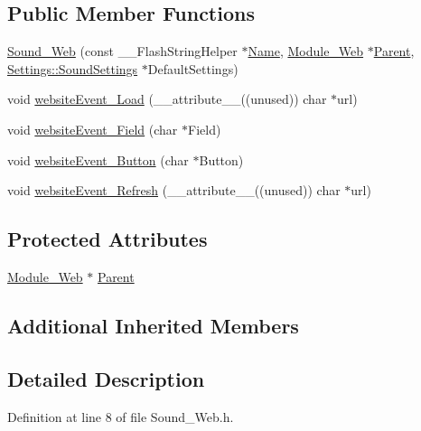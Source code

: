 \subsection*{Public Member Functions}
\begin{DoxyCompactItemize}
\item 
\hyperlink{class_sound___web_a986e9542148fc1fe9b803ea4edc17235}{Sound\+\_\+\+Web} (const \+\_\+\+\_\+\+Flash\+String\+Helper $\ast$\hyperlink{class_common_aeea91a726dbe988e515057b32ba0726f}{Name}, \hyperlink{class_module___web}{Module\+\_\+\+Web} $\ast$\hyperlink{class_sound___web_ac855dfbd5478cd3b7878d7fc1765ab9f}{Parent}, \hyperlink{struct_settings_1_1_sound_settings}{Settings\+::\+Sound\+Settings} $\ast$Default\+Settings)
\item 
void \hyperlink{class_sound___web_ae3a500bbde7e1264aeeb1bf43b5ba09f}{website\+Event\+\_\+\+Load} (\+\_\+\+\_\+attribute\+\_\+\+\_\+((unused)) char $\ast$url)
\item 
void \hyperlink{class_sound___web_a3f9b60318e13f510c7ed49cc52962424}{website\+Event\+\_\+\+Field} (char $\ast$Field)
\item 
void \hyperlink{class_sound___web_ab55e679fab59cd3fae2b7900d31a0893}{website\+Event\+\_\+\+Button} (char $\ast$Button)
\item 
void \hyperlink{class_sound___web_a4b2c5db998fe35455bd3e82ae021d81b}{website\+Event\+\_\+\+Refresh} (\+\_\+\+\_\+attribute\+\_\+\+\_\+((unused)) char $\ast$url)
\end{DoxyCompactItemize}
\subsection*{Protected Attributes}
\begin{DoxyCompactItemize}
\item 
\hyperlink{class_module___web}{Module\+\_\+\+Web} $\ast$ \hyperlink{class_sound___web_ac855dfbd5478cd3b7878d7fc1765ab9f}{Parent}
\end{DoxyCompactItemize}
\subsection*{Additional Inherited Members}


\subsection{Detailed Description}


Definition at line 8 of file Sound\+\_\+\+Web.\+h.



